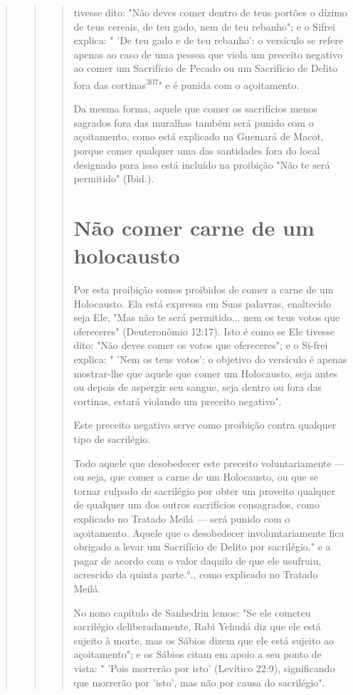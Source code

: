\begin{quote}
\begin{quote}
\begin{quote}
tivesse dito: "Não deves comer dentro de teus portões o dízimo de teus
ce­reais, de teu gado, nem de teu rebanho"; e o Sifrei explica: " 'De
teu gado e de teu rebanho': o versículo se refere apenas ao caso de uma
pessoa que viola um preceito negativo ao comer um Sacrifício de Pecado
ou um Sacrifício de Delito fora das cortinas\textsuperscript{307}" e é
punida com o açoitamento.

Da mesma forma, aquele que comer os sacrifícios menos sagrados fora das
muralhas também será punido com o açoitamento, como está explica­do na
Guemará de Macot, porque comer qualquer uma das santidades fora do local
designado para isso está incluído na proibição "Não te será permitido"
(Ibid.).

\section{Não comer carne de um holocausto}

Por esta proibição somos proibidos de comer a carne de um Holo­causto.
Ela está expressa em Suas palavras, enaltecido seja Ele, "Mas não te
será permitido... nem os teus votos que ofereceres" (Deuteronômio
12:17). Isto é como se Ele tivesse dito: "Não deves comer os votos que
ofereceres"; e o Si-frei explica: " 'Nem os teus votos': o objetivo do
versículo é apenas mostrar-lhe que aquele que comer um Holocausto, seja
antes ou depois de aspergir seu sangue, seja dentro ou fora das
cortinas, estará violando um preceito negativo".

Este preceito negativo serve como proibição contra qualquer tipo de
sacrilégio.

Todo aquele que desobedecer este preceito voluntariamente --- ou seja,
que comer a carne de um Holocausto, ou que se tornar culpado de
sacrilé­gio por obter um proveito qualquer de qualquer um dos outros
sacrifícios con­sagrados, como explicado no Tratado Meilá --- será
punido com o açoitamento. Aquele que o desobedecer involuntariamente
fica obrigado a levar um Sacrifí­cio de Delito por
sacrilégio." e a pagar de acordo com o valor daquilo
de que ele usufruiu, acrescido da quinta
parte.°., como explicado no Tratado
Meilá.

No nono capítulo de Sanhedrin lemos: "Se ele cometeu sacrilégio
deliberadamente, Rabi Yehudá diz que ele está sujeito à morte, mas os
Sábios dizem que ele está sujeito ao açoitamento"; e os Sábios citam em
apoio a seu ponto de vista: " 'Pois morrerão por isto' (Levítico 22:9),
significando que mor­rerão por 'isto', mas não por causa do sacrilégio".


\end{quote}
\end{quote}
\end{quote}
